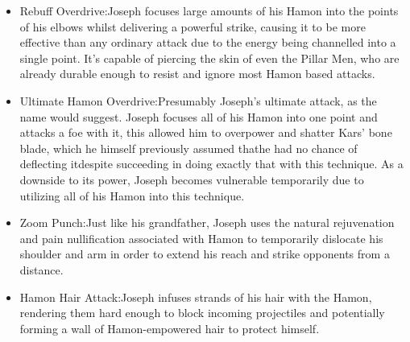 \documentclass[a4paper,12pt]{article}
\begin{document}
\begin{itemize}
\item Rebuff Overdrive:Joseph focuses large amounts of his Hamon into the points of his elbows whilst delivering a powerful strike, causing it to be more effective than any ordinary attack due to the energy being channelled into a single point. It's capable of piercing the skin of even the Pillar Men, who are already durable enough to resist and ignore most Hamon based attacks.
\item Ultimate Hamon Overdrive:Presumably Joseph's ultimate attack, as the name would suggest. Joseph focuses all of his Hamon into one point and attacks a foe with it, this allowed him to overpower and shatter Kars' bone blade, which he himself previously assumed thathe had no chance of deflecting itdespite succeeding in doing exactly that with this technique. As a downside to its power, Joseph becomes vulnerable temporarily due to utilizing all of his Hamon into this technique.
\item Zoom Punch:Just like his grandfather, Joseph uses the natural rejuvenation and pain nullification associated with Hamon to temporarily dislocate his shoulder and arm in order to extend his reach and strike opponents from a distance.
\item Hamon Hair Attack:Joseph infuses strands of his hair with the Hamon, rendering them hard enough to block incoming projectiles and potentially forming a wall of Hamon-empowered hair to protect himself.
\end{itemize}\\ \par \vspace{0.5cm}
\end{document}
